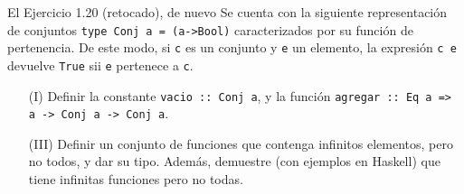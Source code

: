 \documentclass[pdf]{beamer}
\begin{document}
\begin{frame}{El Ejercicio 1.20 (retocado), de nuevo}
Se cuenta con la siguiente representación de conjuntos \texttt{type Conj a = (a->Bool)} caracterizados por su
función de pertenencia. De este modo, si \texttt{c} es un conjunto y \texttt{e} un elemento, la expresión \texttt{c e} devuelve \texttt{True} sii \texttt{e}
pertenece a \texttt{c}.


\begin{enumerate}[label=(\roman*)]

\item[(I)] Definir la constante \texttt{vacio :: Conj a}, y la función \texttt{agregar :: Eq a => a -> Conj a -> Conj a}.

\item[(III)] Definir un conjunto de funciones que contenga infinitos elementos, pero no todos, y dar su tipo. Además, demuestre (con ejemplos en Haskell) que tiene infinitas funciones pero no todas.

\end{enumerate}

\end{frame}
\end{document}
